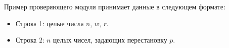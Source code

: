 Пример проверяющего модуля принимает данные в следующем формате: 

\begin{itemize}
\item Строка 1: целые числа $n$, $w$, $r$.
\item Строка 2: $n$ целых чисел, задающих перестановку $p$.
\end{itemize}
